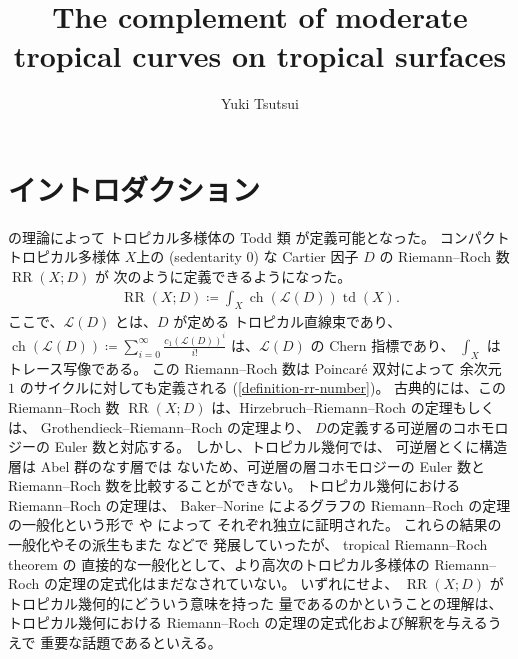 \documentclass[a4paper,dvipdfmx,reqno,12pt]{amsart}
\title{The complement of moderate tropical curves on
tropical surfaces}
\author[Y. Tsutsui]{Yuki Tsutsui}
\theoremstyle{definition}
\newcommand{\deq}{\coloneqq}
\newcommand{\opn}[1]{\operatorname{#1}}
\numberwithin{equation}{section}
\begin{document}
\maketitle

\begin{abstract}
     
\end{abstract}
\section{イントロダクション}

\cite{demedrano2023chern}の理論によって
トロピカル多様体の Todd 類 が定義可能となった。
コンパクトトロピカル多様体
$X$上の (sedentarity 0) な Cartier 因子 $D$ の
Riemann--Roch 数 $\opn{RR}(X;D)$ が
次のように定義できるようになった。
\begin{align}
\label{equation-intro-rr}
\opn{RR}(X;D)\deq 
\int_{X}\opn{ch}(\mathcal{L}(D))\opn{td}(X).
\end{align}
ここで、$\mathcal{L}(D)$ とは、$D$ が定める
トロピカル直線束であり、
$\opn{ch}(\mathcal{L}(D))\deq 
\sum_{i=0}^{\infty}\frac{c_1(\mathcal{L}(D))^{i}}{i!}$
は、$\mathcal{L}(D)$ の Chern 指標であり、
$\int_X$ はトレース写像である。
この Riemann--Roch 数は Poincar\'e 双対によって
余次元 $1$ のサイクルに対しても定義される
(\cref{definition-rr-number})。
古典的には、この Riemann--Roch 数 $\opn{RR}(X;D)$
は、Hirzebruch--Riemann--Roch の定理もしくは、
Grothendieck--Riemann--Roch の定理より、
$D$の定義する可逆層のコホモロジーの Euler 数と対応する。
しかし、トロピカル幾何では、
可逆層とくに構造層は Abel 群のなす層では
ないため、可逆層の層コホモロジーの Euler 数と
Riemann--Roch 数を比較することができない。
トロピカル幾何における Riemann--Roch の定理は、
Baker--Norine によるグラフの Riemann--Roch の定理
\cite{MR2355607} の一般化という形で
\cite{MR2377750} や \cite{MR2457739} によって
それぞれ独立に証明された。
これらの結果の一般化やその派生もまた
\cite{MR3046301,MR4251610,MR4229604,MR4444458,MR4512397} などで
発展していったが、
tropical Riemann--Roch theorem の 
直接的な一般化として、より高次のトロピカル多様体の
Riemann--Roch の定理の定式化はまだなされていない。
いずれにせよ、
$\opn{RR}(X;D)$ がトロピカル幾何的にどういう意味を持った
量であるのかということの理解は、
トロピカル幾何における
Riemann--Roch の定理の定式化および解釈を与えるうえで
重要な話題であるといえる。
\end{document}
